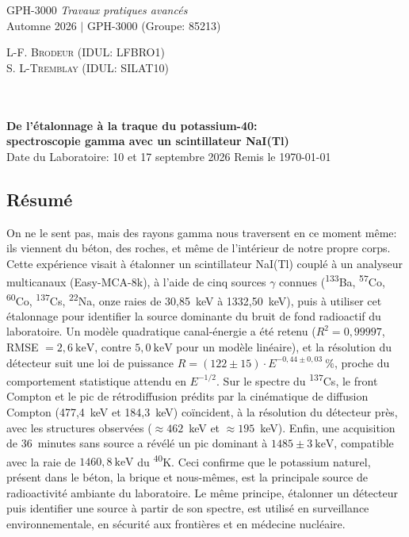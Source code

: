 \documentclass[11pt,letterpaper]{article}
\begin{document}
\thispagestyle{empty} %
\begin{center}

\noindent
\begin{minipage}[t]{0.5\textwidth}
\raggedright
{\large GPH-3000 \textit{Travaux pratiques avancés}}\\
{\large Automne 2026 $\vert$ GPH-3000 (Groupe: 85213)}
\end{minipage}%
\begin{minipage}[t]{0.5\textwidth}
\raggedleft
{\large \textsc{L-F. Brodeur (IDUL: LFBRO1)}}\\
{\large \textsc{S. L-Tremblay (IDUL: SILAT10)}}
\end{minipage}
\\~\\
\vspace{1em}
{\Large \textbf{De l'étalonnage à la traque du potassium-40:} } \\
{\Large \textbf{spectroscopie gamma avec un scintillateur NaI(Tl)} } \\[0.3em]
{\large Date du Laboratoire: 10 et 17 septembre 2026 \qquad\qquad\qquad Remis le \today}

\end{center}

\vspace{0.5em}
\subsection*{Résumé}
On ne le sent pas, mais des rayons gamma nous traversent en ce moment même: ils viennent du béton, des roches, et même de l'intérieur de notre propre corps. Cette expérience visait à étalonner un scintillateur NaI(Tl) couplé à un analyseur multicanaux (Easy-MCA-8k), à l'aide de cinq sources $\gamma$ connues (\textsuperscript{133}Ba, \textsuperscript{57}Co, \textsuperscript{60}Co, \textsuperscript{137}Cs, \textsuperscript{22}Na, onze raies de 30,85~keV à 1332,50~keV), puis à utiliser cet étalonnage pour identifier la source dominante du bruit de fond radioactif du laboratoire. Un modèle quadratique canal-énergie a été retenu ($R^2 = 0{,}99997$, RMSE $= 2{,}6~\text{keV}$, contre $5{,}0~\text{keV}$ pour un modèle linéaire), et la résolution du détecteur suit une loi de puissance $R = (122 \pm 15)\cdot E^{-0{,}44 \pm 0{,}03}~\%$, proche du comportement statistique attendu en $E^{-1/2}$. Sur le spectre du \textsuperscript{137}Cs, le front Compton et le pic de rétrodiffusion prédits par la cinématique de diffusion Compton (477,4~keV et 184,3~keV) coïncident, à la résolution du détecteur près, avec les structures observées ($\approx 462$~keV et $\approx 195$~keV). Enfin, une acquisition de 36~minutes sans source a révélé un pic dominant à $1485 \pm 3~\text{keV}$, compatible avec la raie de $1460{,}8~\text{keV}$ du \textsuperscript{40}K. Ceci confirme que le potassium naturel, présent dans le béton, la brique et nous-mêmes, est la principale source de radioactivité ambiante du laboratoire. Le même principe, étalonner un détecteur puis identifier une source à partir de son spectre, est utilisé en surveillance environnementale, en sécurité aux frontières et en médecine nucléaire.
\end{document}
